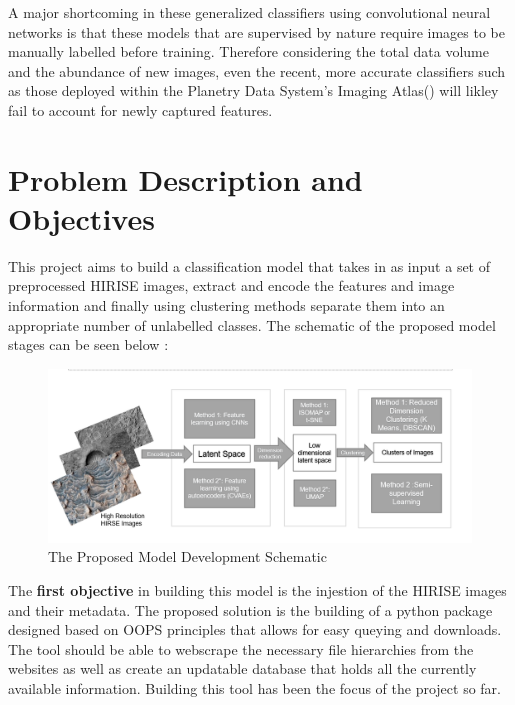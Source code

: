 \documentclass[project-plan]{report-template}
\begin{document}
A major shortcoming in these generalized classifiers using convolutional neural networks is that these models that are supervised by nature require images to be manually labelled before training. Therefore considering the total data volume and the abundance of new images, even the recent, more accurate classifiers such as those deployed within the Planetry Data System's Imaging Atlas(\citeauthor{Wagstaff2018DeepMC})  will likley fail to account for newly captured features. \\



\section{Problem Description and Objectives}
This project aims to build a classification model that takes in as input a set of preprocessed HIRISE images, extract and encode the features and image information and finally using clustering methods separate them into an appropriate number of unlabelled classes. The schematic of the proposed model stages can be seen below :\\

\begin{figure}[htp]
    \begin{center}
        \includegraphics[width=1.1\textwidth]{model-schematic.png}
        \caption{\label{fig:Model Schematic} The Proposed Model Development Schematic }
    \end{center}
\end{figure}


The \textbf{first objective }in building this model is the injestion of the HIRISE images and their metadata. The proposed solution is the building of a python package designed based on OOPS principles that allows for easy queying and downloads. The tool should be able to webscrape the necessary file hierarchies from the websites as well as create an updatable database that holds all the currently available information. Building this tool has been the focus of the project so far. \\
\end{document}
